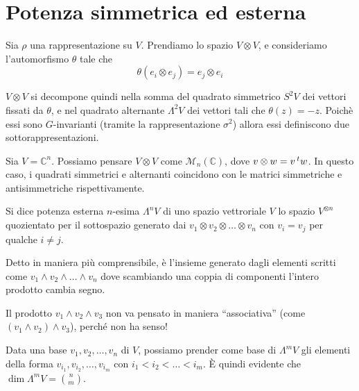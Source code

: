 \documentclass[a4paper,10pt,oneside]{math_article}
\newcommand{\tensor}{\otimes}
\begin{document}
  \section{Potenza simmetrica ed esterna}
  
    \begin{mydef}
     Sia $\rho$ una rappresentazione su $V$. Prendiamo lo spazio $V\otimes V$, e consideriamo l'automorfismo $\theta$ tale che 
     \[
      \theta(e_i \tensor e_j) = e_j \tensor e_i
     \]
     
     $V\otimes V$ si decompone quindi nella somma del quadrato simmetrico $S^2V$ dei vettori fissati da $\theta$, e nel quadrato alternante $\Lambda^2V$ dei vettori tali che $\theta(z) = -z$. Poichè essi sono $G$-invarianti (tramite la rappresentazione $\sigma^2$) allora essi definiscono due sottorappresentazioni.
    \end{mydef}
    
    \begin{myexample}
     Sia $V=\mathbb C^n$. Possiamo pensare $V\otimes V$ come $\mathcal M_n(\mathbb C)$, dove $v \tensor w = v\trasp w$. In questo caso, i quadrati simmetrici e alternanti coincidono con le matrici simmetriche e antisimmetriche rispettivamente.
    \end{myexample}
    
    \begin{mydef}
      Si dice potenza esterna $n$-esima $\Lambda^nV$  di uno spazio vettroriale $V$ lo spazio $V^{\tensor n}$ quozientato per il sottospazio generato dai $v_1 \tensor v_2 \tensor \dots \tensor v_n$ con $v_i=v_j$ per qualche $i\ne j$.  
    \end{mydef}
    
    Detto in maniera più comprensibile, è l'insieme generato dagli elementi scritti come $v_1 \wedge v_2 \wedge \dots \wedge v_n$ dove scambiando una coppia di componenti l'intero prodotto cambia segno.
    
    \begin{Achtung}
     Il prodotto $v_1 \wedge v_2 \wedge v_3$ non va pensato in maniera ``associativa'' (come $(v_1 \wedge v_2) \wedge v_3$), perché non ha senso!
    \end{Achtung}

    Data una base $v_1,v_2,\dots,v_n$ di $V$, possiamo prender come base di $\Lambda^mV$ gli elementi della forma $v_{i_1},v_{i_2},\dots,v_{i_m}$ con $i_1<i_2<\dots<i_m$. \`E quindi evidente che $\dim \Lambda^mV=\binom nm$.    
     
\end{document}
